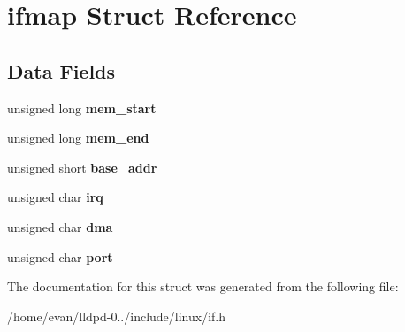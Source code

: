 \section{ifmap \-Struct \-Reference}
\label{structifmap}
\subsection*{\-Data \-Fields}
\begin{DoxyCompactItemize}
\item 
unsigned long {\bfseries mem\-\_\-start}\label{structifmap_ad5445e46d921c03471046b55142d5dcd}

\item 
unsigned long {\bfseries mem\-\_\-end}\label{structifmap_ac6662e4de6e9855aee32b9a04bfd675e}

\item 
unsigned short {\bfseries base\-\_\-addr}\label{structifmap_a5b51288606edf921e09eed88802c1af1}

\item 
unsigned char {\bfseries irq}\label{structifmap_a75d1005c9261010a3e042f332c80e87b}

\item 
unsigned char {\bfseries dma}\label{structifmap_a4f053052da7c15486b0ef403d530b8ee}

\item 
unsigned char {\bfseries port}\label{structifmap_ac89e2c19de60b8f23bdd3789b2af094d}

\end{DoxyCompactItemize}


\-The documentation for this struct was generated from the following file\-:\begin{DoxyCompactItemize}
\item 
/home/evan/lldpd-\/0../include/linux/if.\-h\end{DoxyCompactItemize}
